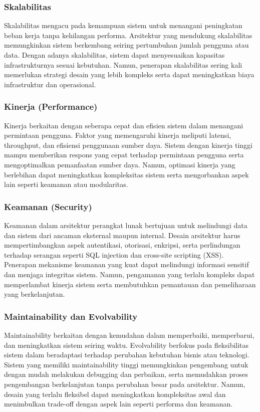 \subsubsection{Skalabilitas}
Skalabilitas mengacu pada kemampuan sistem untuk menangani peningkatan beban kerja tanpa kehilangan performa. Arsitektur yang mendukung skalabilitas memungkinkan sistem berkembang seiring pertumbuhan jumlah pengguna atau data. Dengan adanya skalabilitas, sistem dapat menyesuaikan kapasitas infrastrukturnya sesuai kebutuhan. Namun, penerapan skalabilitas sering kali memerlukan strategi desain yang lebih kompleks serta dapat meningkatkan biaya infrastruktur dan operasional.

\subsubsection{Kinerja (Performance)}
Kinerja berkaitan dengan seberapa cepat dan efisien sistem dalam menangani permintaan pengguna. Faktor yang memengaruhi kinerja meliputi latensi, throughput, dan efisiensi penggunaan sumber daya. Sistem dengan kinerja tinggi mampu memberikan respons yang cepat terhadap permintaan pengguna serta mengoptimalkan pemanfaatan sumber daya. Namun, optimasi kinerja yang berlebihan dapat meningkatkan kompleksitas sistem serta mengorbankan aspek lain seperti keamanan atau modularitas.

\subsubsection{Keamanan (Security)}
Keamanan dalam arsitektur perangkat lunak bertujuan untuk melindungi data dan sistem dari ancaman eksternal maupun internal. Desain arsitektur harus mempertimbangkan aspek autentikasi, otorisasi, enkripsi, serta perlindungan terhadap serangan seperti SQL injection dan cross-site scripting (XSS). Penerapan mekanisme keamanan yang kuat dapat melindungi informasi sensitif dan menjaga integritas sistem. Namun, pengamanan yang terlalu kompleks dapat memperlambat kinerja sistem serta membutuhkan pemantauan dan pemeliharaan yang berkelanjutan.

\subsubsection{Maintainability dan Evolvability}
Maintainability berkaitan dengan kemudahan dalam memperbaiki, memperbarui, dan meningkatkan sistem seiring waktu. Evolvability berfokus pada fleksibilitas sistem dalam beradaptasi terhadap perubahan kebutuhan bisnis atau teknologi. Sistem yang memiliki maintainability tinggi memungkinkan pengembang untuk dengan mudah melakukan debugging dan perbaikan, serta memudahkan proses pengembangan berkelanjutan tanpa perubahan besar pada arsitektur. Namun, desain yang terlalu fleksibel dapat meningkatkan kompleksitas awal dan menimbulkan trade-off dengan aspek lain seperti performa dan keamanan.

